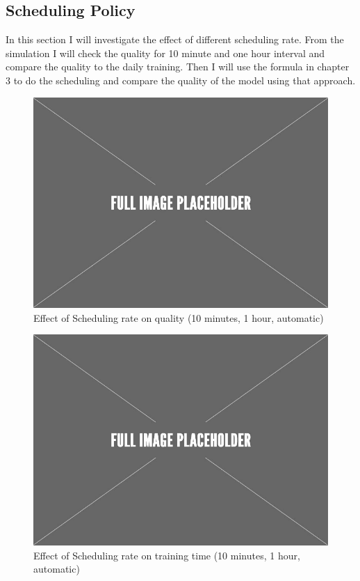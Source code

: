 \subsection{Scheduling Policy}
In this section I will investigate the effect of different scheduling rate.
From the simulation I will check the quality for 10 minute and one hour interval and compare the quality to the daily training.
Then I will use the formula in chapter 3 to do the scheduling and compare the quality of the model using that approach.

\begin{figure}[h!]
\centering
\includegraphics[width=\columnwidth]{../images/placeholder.jpeg}
\caption{Effect of Scheduling rate on quality (10 minutes, 1 hour, automatic)}
\label{fig:scheduling-policy-quality}
\vspace{2mm}
\end{figure}

\begin{figure}[h!]
\centering
\includegraphics[width=\columnwidth]{../images/placeholder.jpeg}
\caption{Effect of Scheduling rate on training time (10 minutes, 1 hour, automatic)}
\label{fig:scheduling-policy-time}
\vspace{2mm}
\end{figure}


